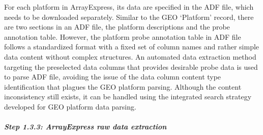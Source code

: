 For each platform in ArrayExpress, its data are specified in the ADF file,
which needs to be downloaded separately.
%
Similar to the GEO `Platform' record, there are two sections in an ADF file,
the platform descriptions and the probe annotation table.
%
However, the platform probe annotation table in ADF file follows a
standardized format with a fixed set of column names and rather simple
data content without complex structures.
%
An automated data extraction method targeting the preselected data
columns that provides desirable probe data is used to parse ADF file,
avoiding the issue of the data column content type identification that
plagues the GEO platform parsing.
%
Although the content inconsistency still exists, it can be handled using
the integrated search strategy developed for GEO platform data parsing.




\subparagraph{Step 1.3.3: ArrayExpress raw data extraction}

% 
%
%

